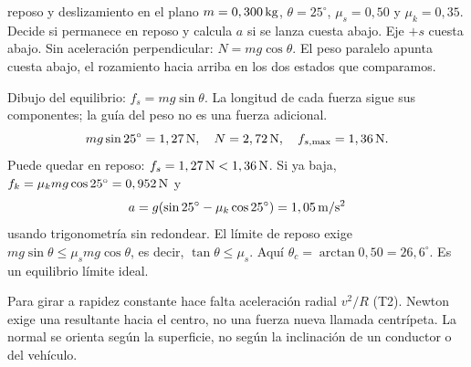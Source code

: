 \documentclass[11pt,a4paper]{article}
\begin{document}
\begin{examplebox}{reposo y deslizamiento en el plano}
 $m=0,300\,\mathrm{kg}$, $\theta=25^\circ$, $\mu_s=0,50$ y
$\mu_k=0,35$. Decide si permanece en reposo y calcula $a$ si se lanza cuesta abajo.
\solutionblock
{} Eje $+s$ cuesta abajo. Sin aceleraci\'on perpendicular:
$N=mg\cos\theta$. El peso paralelo apunta cuesta abajo, el rozamiento
hacia arriba en los dos estados que comparamos.
\begin{center}
\end{center}
Dibujo del equilibrio: $f_s=mg\sin\theta$. La longitud de cada fuerza sigue
sus componentes; la gu\'ia del peso no es una fuerza adicional.
\[
mg\sin25^\circ=1,27\,\mathrm{N},\quad N=2,72\,\mathrm{N},\quad f_{s,\max}=1,36\,\mathrm{N}.
\]
Puede quedar en reposo: $f_s=1,27\,\mathrm{N}<1,36\,\mathrm{N}$.
Si ya baja, $f_k=\mu_kmg\cos25^\circ=0,952\,\mathrm{N}$ y
\[
a=g(\sin25^\circ-\mu_k\cos25^\circ)=1,05\,\mathrm{m/s^2}
\]
usando trigonometr\'ia sin redondear.
 El l\'imite de reposo exige
$mg\sin\theta\le\mu_smg\cos\theta$, es decir, $\tan\theta\le\mu_s$.
Aqu\'i $\theta_c=\arctan0,50=26,6^\circ$. Es un equilibrio l\'imite ideal.
\end{examplebox}

Para girar a rapidez constante hace falta aceleraci\'on radial $v^2/R$
(T2). Newton exige una resultante hacia el centro, no una fuerza nueva llamada
centr\'ipeta. La normal se orienta seg\'un la superficie, no seg\'un la inclinaci\'on
de un conductor o del veh\'iculo.
\end{document}
